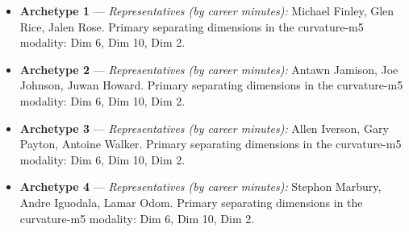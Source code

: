 \begin{itemize}
\item \textbf{Archetype 1} --- \emph{Representatives (by career minutes):} Michael Finley, Glen Rice, Jalen Rose. Primary separating dimensions in the curvature-m5 modality: Dim 6, Dim 10, Dim 2.
\item \textbf{Archetype 2} --- \emph{Representatives (by career minutes):} Antawn Jamison, Joe Johnson, Juwan Howard. Primary separating dimensions in the curvature-m5 modality: Dim 6, Dim 10, Dim 2.
\item \textbf{Archetype 3} --- \emph{Representatives (by career minutes):} Allen Iverson, Gary Payton, Antoine Walker. Primary separating dimensions in the curvature-m5 modality: Dim 6, Dim 10, Dim 2.
\item \textbf{Archetype 4} --- \emph{Representatives (by career minutes):} Stephon Marbury, Andre Iguodala, Lamar Odom. Primary separating dimensions in the curvature-m5 modality: Dim 6, Dim 10, Dim 2.
\end{itemize}
